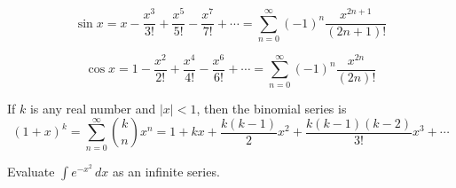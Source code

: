 \[\sin x=x-\frac{x^3}{3!}+\frac{x^5}{5!}-\frac{x^7}{7!}+\cdots
=\sum_{n=0}^\infty(-1)^n\frac{x^{2n+1}}{(2n+1)!}\]

\[\cos x=1-\frac{x^2}{2!}+\frac{x^4}{4!}-\frac{x^6}{6!}+\cdots
=\sum_{n=0}^\infty(-1)^n\frac{x^{2n}}{(2n)!}\]

If \(k\) is any real number and \(|x|<1\), then the binomial series is
\[(1+x)^k=\sum_{n=0}^\infty\binom{k}{n}x^n=1+kx+\frac{k(k-1)}{2}x^2
+\frac{k(k-1)(k-2)}{3!}x^3+\cdots\]
\begin{problem}
    Evaluate \(\displaystyle{\int e^{-x^2}}\,dx\) as an infinite series.
\end{problem}